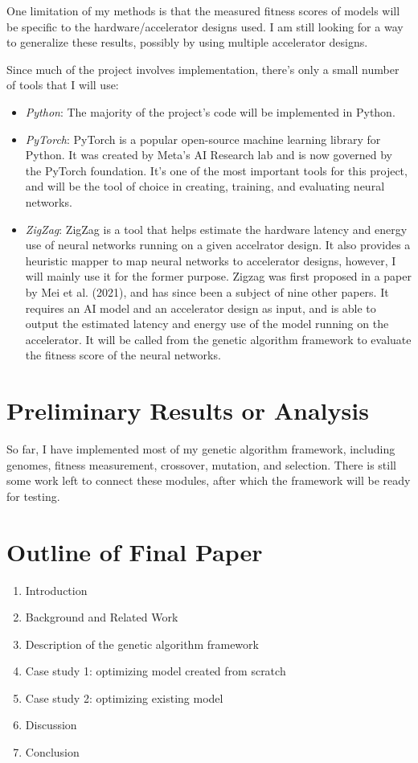 \documentclass[sigconf]{acmart}
\begin{document}
One limitation of my methods is that the measured fitness scores of models will be specific to the hardware/accelerator designs used. I am still looking for a way
to generalize these results, possibly by using multiple accelerator designs.

Since much of the project involves implementation, there's only a small number of tools that I will use:
\begin{itemize}
    \item \emph{Python}: The majority of the project's code will be implemented in Python.
    \item \emph{PyTorch}: PyTorch is a popular open-source machine learning library for Python. 
                   It was created by Meta's AI Research lab and is now governed by the PyTorch foundation.
                   It's one of the most important tools for this project, and will be the tool of choice in creating, training, and evaluating neural networks.
    \item \emph{ZigZag}: ZigZag is a tool that helps estimate the hardware latency and energy use of neural networks running on a given accelrator design.
                  It also provides a heuristic mapper to map neural networks to accelerator designs, however, I will mainly use it for the former purpose.
                  Zigzag was first proposed in a paper by Mei et al. (2021), and has since been a subject of nine other papers. It requires an AI model and an accelerator
                  design as input, and is able to output the estimated latency and energy use of the model running on the accelerator. It will be called from the genetic algorithm framework
                  to evaluate the fitness score of the neural networks.
                   
\end{itemize}

\section{Preliminary Results or Analysis}
So far, I have implemented most of my genetic algorithm framework, including genomes, fitness measurement, crossover, mutation, and selection.
There is still some work left to connect these modules, after which the framework will be ready for testing.

\section{Outline of Final Paper}
\begin{enumerate}
    \item Introduction
    \item Background and Related Work
    \item Description of the genetic algorithm framework
    \item Case study 1: optimizing model created from scratch
    \item Case study 2: optimizing existing model
    \item Discussion
    \item Conclusion
\end{enumerate}
\end{document}
